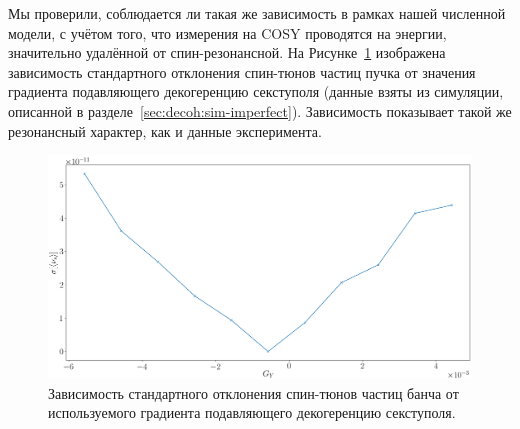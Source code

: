 Мы проверили, соблюдается ли такая же зависимость в рамках нашей численной модели, с учётом того, что измерения на COSY проводятся на энергии, значительно удалённой от спин-резонансной. На Рисунке~\ref{fig:SCT_resonance} изображена зависимость стандартного отклонения спин-тюнов частиц пучка от значения градиента подавляющего декогеренцию секступоля (данные взяты из симуляции, описанной в разделе~\ref{sec:decoh:sim-imperfect}). Зависимость показывает такой же резонансный характер, как и данные эксперимента.

\begin{figure}[H]
	\centering
	\includegraphics[width=\linewidth]{images/decoh_sim/stune_sd_vs_sext_strength_resonance}
	\caption{Зависимость стандартного отклонения спин-тюнов частиц банча от используемого градиента подавляющего декогеренцию секступоля.\label{fig:SCT_resonance}}
\end{figure}
